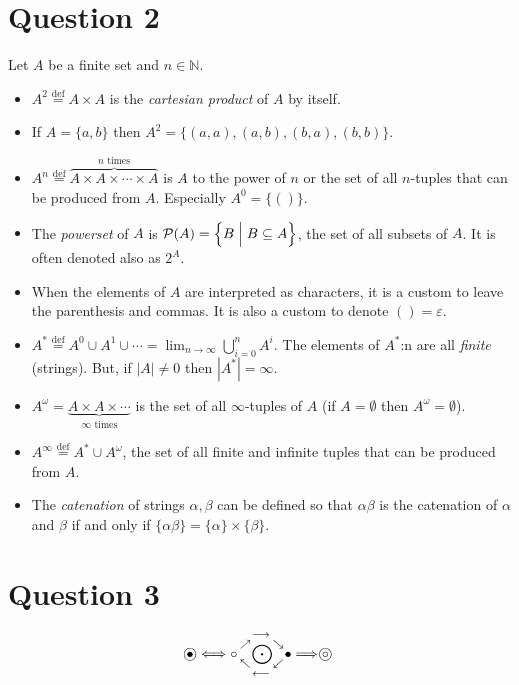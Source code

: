 \documentclass[a4paper,12pt]{article}
\begin{document}
\section{Question 2}

Let $A$ be a finite set and  $n\in\mathbb{N}$.
\begin{itemize}
\item $A^2 \stackrel{\textrm{def}}{=} A\times A$ is the \emph{cartesian product} of $A$ by itself.
\item If $A=\{a,b\}$ then $A^2 = \{(a,a),(a,b),(b,a),(b,b)\}.$
\item $A^n \stackrel{\textrm{def}}{=} \overbrace{ A\times A\times \cdots\times A}^\textrm{$n$ times}$ is $A$ to the power of $n$ or the set of all $n$-tuples that can be produced from $A$. Especially $A^0=\{()\}$.
\item The \emph{powerset} of $A$ is $\mathcal{P}(A)= \Bigl\{B\Bigm|B\subseteq A\Bigl\}$, the set of all subsets of $A$. It is often denoted also as $2^A$.
\item When the elements of $A$ are interpreted as characters, it is a custom to leave the parenthesis and commas.
It is also a custom to denote $() =\varepsilon$.
\item $A^*\stackrel{\textrm{def}}{=}A^0\cup A^1\cup\cdots \displaystyle=\lim_{n \to \infty}\bigcup_{i=0}^n A^i$. The elements of $A^*$:n are all \emph{finite} (strings). 
But, if $|A|\ne 0$ then $|A^*|=\infty$.	
\item $A^\omega= \underbrace{A\times A\times\cdots}_\text{$\infty$ times}$ is the set of all $\infty$-tuples of $A$ (if $A= \emptyset$ then $A^\omega=\emptyset$).
\item $A^\infty\stackrel{\textrm{def}}{=}A^*\cup A^\omega$, the set of all finite and infinite tuples that can be produced from $A$.
\item The \emph{catenation} of strings $\alpha,\beta$ can be defined so that 
$\alpha\beta$ is the catena\-tion of $\alpha$ and $\beta$ if and only if  $\{\alpha\beta\}=\{\alpha\}\times\{\beta\}$.
\end{itemize}
\pagebreak

\section{Question 3}

\[
\bullet\hspace{-0.75em}\bigcirc \Longleftrightarrow\circ 
\overset{\longrightarrow}
{\underset{\longleftarrow} 
{\sideset{_\nwarrow^\nearrow}
{_\swarrow^\searrow}\bigodot}}\bullet\Longrightarrow 
\circ\hspace{-0.75em}\bigcirc
\]
\end{document}
